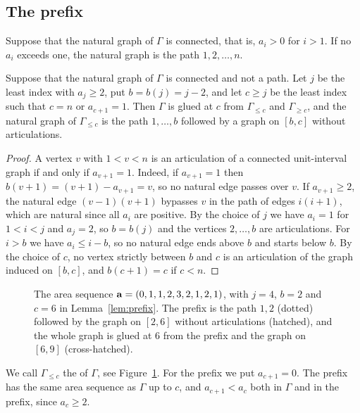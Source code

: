 \subsection{The prefix}

Suppose that the natural graph of $\Gamma$ is connected, that is, $a_i>0$ for
$i>1$.
If no $a_i$ exceeds one, the natural graph is the path $1,2,\dotsc,n$.

\begin{lemma}\label{lem:prefix}
Suppose that the natural graph of $\Gamma$ is connected and not a path.
Let $j$ be the least index with $a_j\geq2$, put $b=b(j)=j-2$, and let
$c\geq j$ be the least index such that $c=n$ or $a_{c+1}=1$.
Then $\Gamma$ is glued at $c$ from $\Gamma_{\leq c}$ and $\Gamma_{\geq c}$, and
the natural graph of $\Gamma_{\leq c}$ is the path $1,\dotsc,b$ followed by a
graph on $[b,c]$ without articulations.
\end{lemma}

\begin{proof}
A vertex $v$ with $1<v<n$ is an articulation of a connected unit-interval graph
if and only if $a_{v+1}=1$.
Indeed, if $a_{v+1}=1$ then $b(v+1)=(v+1)-a_{v+1}=v$, so no natural edge passes
over $v$.
If $a_{v+1}\geq2$, the natural edge $(v-1)(v+1)$ bypasses $v$ in the path of
edges $i(i+1)$, which are natural since all $a_i$ are positive.
By the choice of $j$ we have $a_i=1$ for $1<i<j$ and $a_j=2$, so $b=b(j)$ and
the vertices $2,\dotsc,b$ are articulations.
For $i>b$ we have $a_i\leq i-b$, so no natural edge ends above $b$ and starts
below $b$.
By the choice of $c$, no vertex strictly between $b$ and $c$ is an
articulation of the graph induced on $[b,c]$, and $b(c+1)=c$ if $c<n$.
\end{proof}

\begin{figure}[!ht]
\centering
{}
\caption{The area sequence $\mathbf{a}=(0,1,1,2,3,2,1,2,1)$, with $j=4$, $b=2$ and $c=6$ in
Lemma~\ref{lem:prefix}.
The prefix is the path $1,2$ (dotted) followed by the graph on $[2,6]$ without
articulations (hatched), and the whole graph is glued at $6$ from the prefix and
the graph on $[6,9]$ (cross-hatched).}
\label{fig:prefix}
\end{figure}

We call $\Gamma_{\leq c}$ the  of $\Gamma$, see Figure~\ref{fig:prefix}.
For the prefix we put $a_{c+1}=0$.
The prefix has the same area sequence as $\Gamma$ up to $c$, and
$a_{c+1}<a_c$ both in $\Gamma$ and in the prefix, since $a_c\geq2$.


